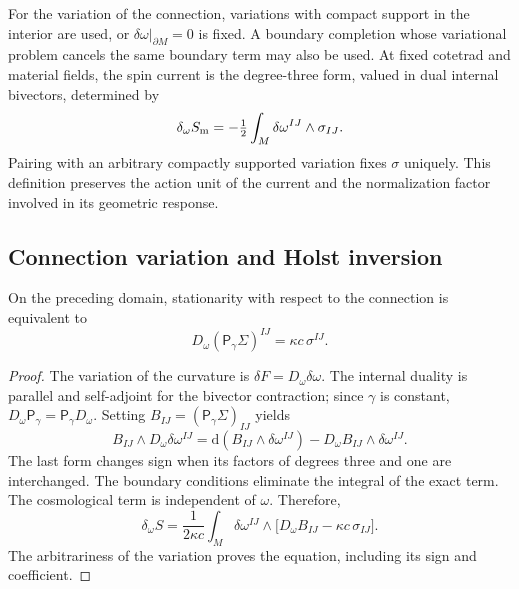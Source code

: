 For the variation of the connection, variations with compact support in the interior are used, or \(\delta\omega|_{\partial M}=0\) is fixed. A boundary completion whose variational problem cancels the same boundary term may also be used. At fixed cotetrad and material fields, the spin current is the degree-three form, valued in dual internal bivectors, determined by
\begin{equation}
 \delta_\omega S_{\rm m}
 =-\tfrac12\int_M\delta\omega^{IJ}\wedge\sigma_{IJ}.
 \label{vii:vii:eq:corriente-variacional}
\end{equation}
Pairing with an arbitrary compactly supported variation fixes \(\sigma\) uniquely. This definition preserves the action unit of the current and the normalization factor involved in its geometric response.

\subsection{Connection variation and Holst inversion}
\label{vii:vii:subsec:variacion-holst}

\begin{theorem}
\label{vii:vii:thm:ecuacion-cartan-holst}
On the preceding domain, stationarity with respect to the connection is equivalent to
\begin{equation}
 D_\omega(\mathsf P_\gamma\Sigma)^{IJ}
       =\kappa c\,\sigma^{IJ}.
 \label{vii:vii:eq:ecuacion-cartan-holst}
\end{equation}
\end{theorem}
\begin{proof}
The variation of the curvature is \(\delta F=D_\omega\delta\omega\). The internal duality is parallel and self-adjoint for the bivector contraction; since \(\gamma\) is constant, \(D_\omega\mathsf P_\gamma=\mathsf P_\gamma D_\omega\). Setting \(B_{IJ}=(\mathsf P_\gamma\Sigma)_{IJ}\) yields
\[
 B_{IJ}\wedge D_\omega\delta\omega^{IJ}
 =\mathrm d(B_{IJ}\wedge\delta\omega^{IJ})
   -D_\omega B_{IJ}\wedge\delta\omega^{IJ}.
\]
The last form changes sign when its factors of degrees three and one are interchanged. The boundary conditions eliminate the integral of the exact term. The cosmological term is independent of \(\omega\). Therefore,
\[
 \delta_\omega S=
 \frac1{2\kappa c}\int_M\delta\omega^{IJ}\wedge
       \bigl[D_\omega B_{IJ}-\kappa c\,\sigma_{IJ}\bigr].
\]
The arbitrariness of the variation proves the equation, including its
sign and coefficient.
\end{proof}

